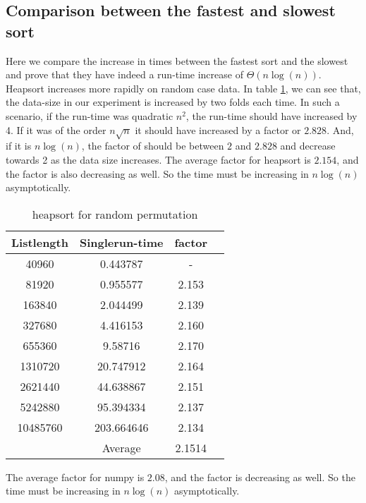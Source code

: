 \documentclass[sigconf, nonacm, natbib, screen, balance=False]{acmart}
\begin{document}
\subsection{Comparison between the fastest and slowest sort}\label{math}
Here we compare the increase in times between the fastest sort and the slowest and prove that they have indeed a run-time increase of $\Theta \left(n \log\left(n\right)\right)$. Heapsort increases more rapidly on random case data. In table \ref{tab:table2}, we can see that, the data-size in our experiment is increased by two folds each time. In such a scenario, if the run-time was quadratic $n^2$, the run-time should have increased by 4. If it was of the order $n\sqrt{n}$ it should have increased by a factor or $2.828$. And, if it is $n\log\left(n\right)$, the factor of should be between $2$ and $2.828$ and decrease towards 2 as the data size increases. The average factor for heapsort is $2.154$, and the factor is also decreasing as well. So the time must be increasing in $n\log\left(n\right)$ asymptotically. 

\begin{table}[ht]
\caption{heapsort for random permutation }
\label{tab:table2}
\begin{center}
\begin{tabular}{|c|c|c|c|} 
\hline
\textbf{Listlength} & 	\textbf{Singlerun-time} & \textbf{factor} \\ 
\hline
40960 & 	0.443787 & 	- \\ 
81920 & 	0.955577 & 	2.153 \\ 
163840 & 	2.044499 & 	2.139 \\ 
327680 & 	4.416153 & 	2.160 \\ 
655360 & 	9.58716 & 	2.170 \\ 
1310720 & 	20.747912 & 	2.164 \\ 
2621440 & 	44.638867 & 	2.151 \\ 
5242880 & 	95.394334 & 	2.137 \\ 
10485760 & 	203.664646 & 	2.134 \\ 
\hline
	 & 	Average & 	2.1514 \\ 	
\hline
\end{tabular}
\end{center}
\end{table}

The average factor for numpy is $2.08$, and the factor is decreasing as well. So the time must be increasing in $n\log\left(n\right)$ asymptotically. 
\end{document}
